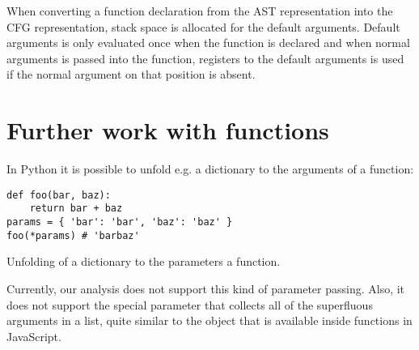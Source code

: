 When converting a function declaration from the AST representation into the CFG representation, stack space is allocated for the default arguments. Default arguments is only evaluated once when the function is declared and when normal arguments is passed into the function, registers to the default arguments is used if the normal argument on that position is absent.

\section{Further work with functions}
In Python it is possible to unfold e.g. a dictionary to the arguments of a function:

\begin{listing}[H]
	\begin{verbatim}
def foo(bar, baz):
	return bar + baz
params = { 'bar': 'bar', 'baz': 'baz' }
foo(*params) # 'barbaz'
	\end{verbatim}
\caption{Unfolding of a dictionary to the parameters a function.}\label{code:UnfoldDictFunctionExample}
\end{listing}

Currently, our analysis does not support this kind of parameter passing. Also, it does not support the special  parameter that collects all of the superfluous arguments in a list, quite similar to the  object that is available inside functions in JavaScript.